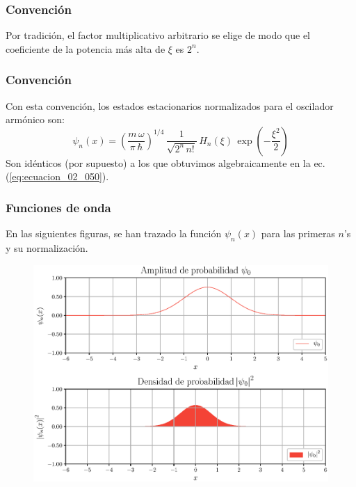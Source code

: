 \documentclass[12pt]{beamer}
\begin{document}
\begin{frame}
\frametitle{Convención}
Por tradición, el factor multiplicativo arbitrario se elige de modo que el coeficiente de la potencia más alta de $\xi$ es $2^{n}$.
\end{frame}
\begin{frame}
\frametitle{Convención}
Con esta convención, los estados estacionarios normalizados para el oscilador armónico son:
\pause
\begin{equation}
\psi_{n} (x) = \left( \dfrac{m \, \omega}{\pi \, \hbar} \right)^{1/4} \, \dfrac{1}{\sqrt{2^{n} \, n!}} \, H_{n} (\xi) \, \exp \left( - \dfrac{\xi^{2}}{2} \right)
\label{eq:ecuacion_02_069}
\end{equation}
Son idénticos (por supuesto) a los que obtuvimos algebraicamente en la ec. (\ref{eq:ecuacion_02_050}).
\end{frame}
\begin{frame}
\frametitle{Funciones de onda}
En las siguientes figuras, se han trazado la función $\psi_{n} (x)$ para las primeras $n$'s y su normalización.
\end{frame}
\begin{frame}[plain]
\begin{figure}[H]
    \centering
    \includegraphics[scale=0.5]{Imagenes/Funcion_Onda_00.eps}
\end{figure}
\end{frame}
\end{document}

